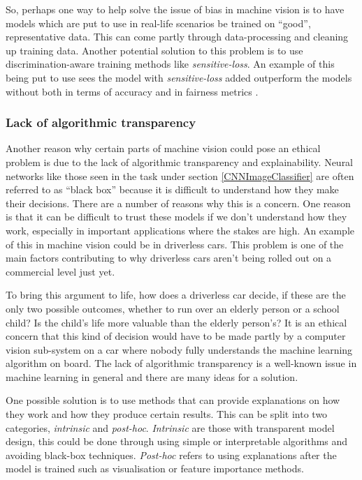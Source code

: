 \documentclass[11pt, letterpaper]{article}
\begin{document}
So, perhaps one way to help solve the issue of bias in machine vision is to have models which are put to use in real-life scenarios be trained on ``good'', representative data. This can come partly through data-processing and cleaning up training data. Another potential solution to this problem is to use discrimination-aware training methods like \textit{sensitive-loss}. An example of this being put to use sees the model with \textit{sensitive-loss} added outperform the models without both in terms of accuracy and in fairness metrics \cite{SernaImprovingFaceRepresentation}.

\subsubsection*{Lack of algorithmic transparency}
Another reason why certain parts of machine vision could pose an ethical problem is due to the lack of algorithmic transparency and explainability. Neural networks like those seen in the task under section \ref{CNNImageClassifier} are often referred to as ``black box'' because it is difficult to understand how they make their decisions. There are a number of reasons why this is a concern. One reason is that it can be difficult to trust these models if we don't understand how they work, especially in important applications where the stakes are high. An example of this in machine vision could be in driverless cars. This problem is one of the main factors contributing to why driverless cars aren't being rolled out on a commercial level just yet.

To bring this argument to life, how does a driverless car decide, if these are the only two possible outcomes, whether to run over an elderly person or a school child? Is the child's life more valuable than the elderly person's? It is an ethical concern that this kind of decision would have to be made partly by a computer vision sub-system on a car where nobody fully understands the machine learning algorithm on board. The lack of algorithmic transparency is a well-known issue in machine learning in general and there are many ideas for a solution. 

One possible solution is to use methods that can provide explanations on how they work and how they produce certain results. This can be split into two categories, \textit{intrinsic} and \textit{post-hoc}. \textit{Intrinsic} are those with transparent model design, this could be done through using simple or interpretable algorithms and avoiding black-box techniques. \textit{Post-hoc} refers to using explanations after the model is trained such as visualisation or feature importance methods. 
\end{document}
